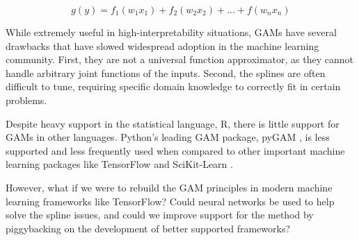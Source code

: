 \begin{equation}
    \label{eq:gam}
    g(y) = f_1(w_1 x_1) + f_2(w_2 x_2) + ... + f(w_n x_n)
\end{equation}


While extremely useful in high-interpretability situations, GAMs have several drawbacks that have slowed widespread adoption in the machine learning community. First, they are not a universal function approximator, as they cannot handle arbitrary joint functions of the inputs. Second, the splines are often difficult to tune, requiring specific domain knowledge to correctly fit in certain problems.

Despite heavy support in the statistical language, R, there is little support for GAMs in other languages. Python's leading GAM package, pyGAM \citep{Serven2018PyGAM:Python}, is less supported and less frequently used when compared to other important machine learning packages like TensorFlow \citep{Allaire2019RTensorFlow} and SciKit-Learn \citep{Pedregosa2011Scikit-learn:Python}. 

However, what if we were to rebuild the GAM principles in modern machine learning frameworks like TensorFlow? Could neural networks be used to help solve the spline issues, and could we improve support for the method by piggybacking on the development of better supported frameworks?
